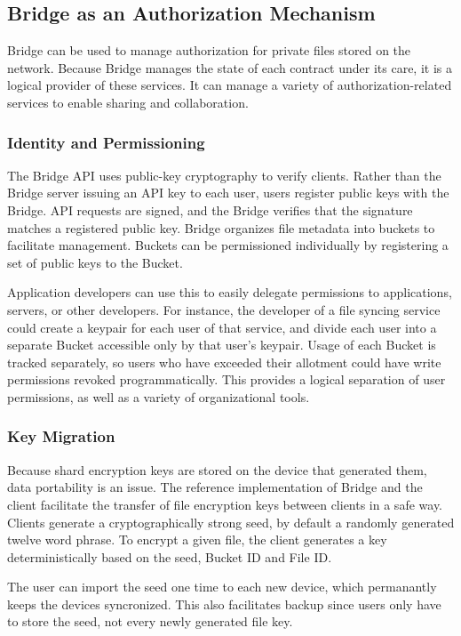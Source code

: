 \documentclass[a4paper,10pt]{article}
\begin{document}
\subsection{Bridge as an Authorization Mechanism}
Bridge can be used to manage authorization for private files stored on the
network. Because Bridge manages the state of each contract under its care, it is
a logical provider of these services. It can manage a variety of
authorization-related services to enable sharing and collaboration.

\subsubsection{Identity and Permissioning}
The Bridge API uses public-key cryptography to verify clients. Rather than the
Bridge server issuing an API key to each user, users register public keys with
the Bridge. API requests are signed, and the Bridge verifies that the signature
matches a registered public key. Bridge organizes file metadata into buckets to
facilitate management. Buckets can be permissioned individually by registering a
set of public keys to the Bucket.

Application developers can use this to easily delegate permissions to
applications, servers, or other developers. For instance, the developer of a
file syncing service could create a keypair for each user of that service, and
divide each user into a separate Bucket accessible only by that user’s keypair.
Usage of each Bucket is tracked separately, so users who have exceeded their
allotment could have write permissions revoked programmatically. This provides a
logical separation of user permissions, as well as a variety of organizational
tools.

\subsubsection{Key Migration}
Because shard encryption keys are stored on the device that generated them, data
portability is an issue. The reference implementation of Bridge and the client
facilitate the transfer of file encryption keys between clients in a safe way.
Clients generate a cryptographically strong seed, by default a randomly
generated twelve word phrase. To encrypt a given file, the client generates a
key deterministically based on the seed, Bucket ID and File ID.

The user can import the seed one time to each new device, which permanantly
keeps the devices syncronized. This also facilitates backup since users only
have to store the seed, not every newly generated file key.
\end{document}
